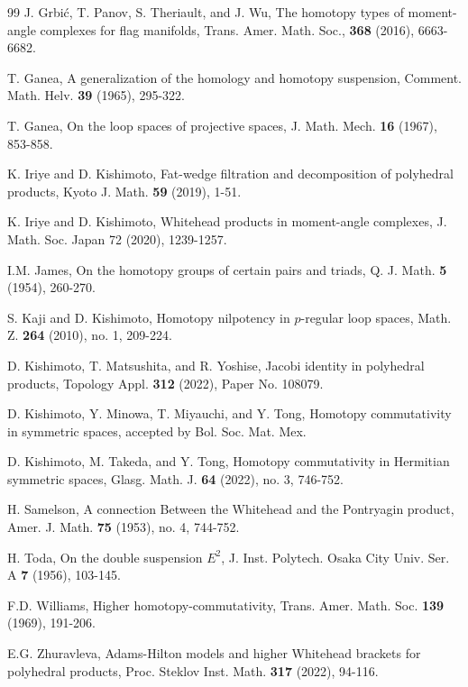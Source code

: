 \documentclass[a4paper]{amsart}
\numberwithin{equation}{section}
\theoremstyle{definition}
\theoremstyle{remark}
\numberwithin{equation}{section}
\begin{document}
\begin{thebibliography}{99}
   J. Grbi\'{c}, T. Panov, S. Theriault, and J. Wu, The homotopy types of moment-angle complexes for flag manifolds, Trans. Amer. Math. Soc., \textbf{368} (2016), 6663-6682.

   T. Ganea, A generalization of the homology and homotopy suspension, Comment. Math. Helv. \textbf{39} (1965), 295-322.

   T. Ganea, On the loop spaces of projective spaces, J. Math. Mech. \textbf{16} (1967), 853-858.


   K. Iriye and D. Kishimoto, Fat-wedge filtration and decomposition of polyhedral products, Kyoto J. Math. \textbf{59} (2019), 1-51.

   K. Iriye and D. Kishimoto, Whitehead products in moment-angle complexes, J. Math. Soc. Japan 72 (2020), 1239-1257.

   I.M. James, On the homotopy groups of certain pairs and triads, Q. J. Math. \textbf{5} (1954), 260-270.

   S. Kaji and D. Kishimoto, Homotopy nilpotency in $p$-regular loop spaces, Math. Z. \textbf{264} (2010), no. 1, 209-224.

   D. Kishimoto, T. Matsushita, and R. Yoshise, Jacobi identity in polyhedral products, Topology Appl. \textbf{312} (2022), Paper No. 108079.

   D. Kishimoto, Y. Minowa, T. Miyauchi, and Y. Tong, Homotopy commutativity in symmetric spaces, accepted by Bol. Soc. Mat. Mex.

   D. Kishimoto, M. Takeda, and Y. Tong, Homotopy commutativity in Hermitian symmetric spaces, Glasg. Math. J. \textbf{64} (2022), no. 3, 746-752.

   H. Samelson, A connection Between the Whitehead and the Pontryagin product, Amer. J. Math. \textbf{75} (1953), no. 4, 744-752.

   H. Toda, On the double suspension $E^2$, J. Inst. Polytech. Osaka City Univ. Ser. A \textbf{7} (1956), 103-145.

   F.D. Williams, Higher homotopy-commutativity, Trans. Amer. Math. Soc. \textbf{139} (1969), 191-206.

   E.G. Zhuravleva, Adams-Hilton models and higher Whitehead brackets for polyhedral products, Proc. Steklov Inst. Math. \textbf{317} (2022), 94-116.
\end{thebibliography}
\end{document}

